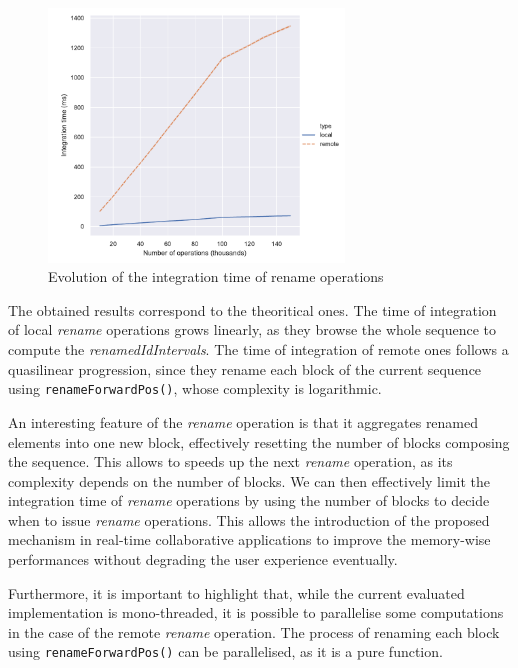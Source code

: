 \documentclass{article}
\theoremstyle{definition}
\begin{document}
\begin{figure}
    \centering
    \includegraphics[width=0.7\textwidth]{img/integration-time-rename-0.pdf}
    \caption{Evolution of the integration time of rename operations}
    \label{fig:evolution-integration-time-rename}
\end{figure}

The obtained results correspond to the theoritical ones.
The time of integration of local \emph{rename} operations grows linearly, as they browse the whole sequence to compute the \emph{renamedIdIntervals}.
The time of integration of remote ones follows a quasilinear progression, since they rename each block of the current sequence using \verb|renameForwardPos()|, whose complexity is logarithmic.

An interesting feature of the \emph{rename} operation is that it aggregates renamed elements into one new block, effectively resetting the number of blocks composing the sequence.
This allows to speeds up the next \emph{rename} operation, as its complexity depends on the number of blocks.
We can then effectively limit the integration time of \emph{rename} operations by using the number of blocks to decide when to issue \emph{rename} operations.
This allows the introduction of the proposed mechanism in real-time collaborative applications to improve the memory-wise performances without degrading the user experience eventually.

Furthermore, it is important to highlight that, while the current evaluated implementation is mono-threaded, it is possible to parallelise some computations in the case of the remote \emph{rename} operation.
The process of renaming each block using \verb|renameForwardPos()| can be parallelised, as it is a pure function.
\end{document}
